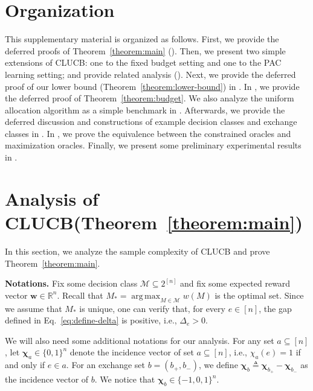 \documentclass{article}
\newcommand{\Algorithm}{{\small \textsf{CLUCB}}\xspace}
\newcommand{\M}{\mathcal M}
\newcommand{\RR}{\mathbb R}
\DeclareMathOperator*{\argmax}{arg\,max}
\renewcommand{\vec}[1]{\boldsymbol{#1}}
\begin{document}
\maketitle

\section*{Organization}
This supplementary material is organized as follows.
First, we provide the deferred proofs of Theorem~\ref{theorem:main} ().
Then, we present two simple extensions of \Algorithm: one to the fixed budget setting and one to the PAC learning setting; and provide related analysis ().
Next, we provide the deferred proof of our lower bound (Theorem~\ref{theorem:lower-bound}) in .
In , we provide the deferred proof of Theorem~\ref{theorem:budget}.
We also analyze the uniform allocation algorithm as a simple benchmark in .
Afterwards, we provide the deferred discussion and constructions of example decision classes and exchange classes in . 
In , we prove the equivalence between the constrained oracles and maximization oracles.
Finally, we present some preliminary experimental results in .


\section{Analysis of \Algorithm (Theorem~\ref{theorem:main})}
\label{section:proof-algorithm}

In this section, we analyze the sample complexity of \Algorithm and prove Theorem~\ref{theorem:main}.

\textbf{Notations.} 
Fix some decision class $\M\subseteq 2^{[n]}$ and fix some expected reward vector $\vec w\in \RR^n$. 
Recall that $M_* = \argmax_{M\in \M} w(M)$ is the optimal set.
Since we assume that $M_*$ is unique, one can verify that, for every $e\in [n]$, the gap defined in Eq.~\eqref{eq:define-delta} is positive, i.e., $\Delta_e > 0$.

We will also need some additional notations for our analysis.
For any set $a\subseteq [n]$, let $\vec \chi_a \in \{0,1\}^n$ denote the incidence vector of set $a \subseteq [n]$, i.e., $\chi_a(e) = 1$ if and only if $e\in a$.
For an exchange set $b=(b_+,b_-)$, we define $\vec \chi_b \triangleq \vec \chi_{b_+}- \vec \chi_{b_-}$ as the incidence vector of $b$.
We notice that $\vec \chi_b \in \{-1,0,1\}^n$.
\end{document}
